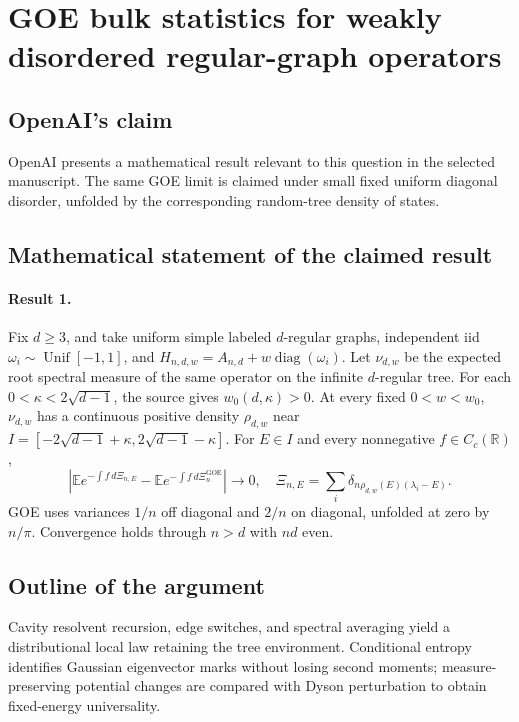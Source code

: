 \documentclass[11pt]{article}
\begin{document}
\section*{GOE bulk statistics for weakly disordered regular-graph operators}

\subsection{OpenAI's claim}
OpenAI presents a mathematical result relevant to this question in the selected manuscript. The same GOE limit is claimed under small fixed uniform diagonal disorder, unfolded by the corresponding random-tree density of states.

\subsection{Mathematical statement of the claimed result}
\paragraph{Result 1.} Fix \(d\ge3\), and take uniform simple labeled \(d\)-regular graphs, independent iid \(\omega_i\sim\operatorname{Unif}[-1,1]\), and \(H_{n,d,w}=A_{n,d}+w\operatorname{diag}(\omega_i)\). Let \(\nu_{d,w}\) be the expected root spectral measure of the same operator on the infinite \(d\)-regular tree. For each \(0<\kappa<2\sqrt{d-1}\), the source gives \(w_0(d,\kappa)>0\). At every fixed \(0<w<w_0\), \(\nu_{d,w}\) has a continuous positive density \(\rho_{d,w}\) near \(I=[-2\sqrt{d-1}+\kappa,2\sqrt{d-1}-\kappa]\). For \(E\in I\) and every nonnegative \(f\in C_c(\mathbb R)\),
\[
 \left|\mathbb E e^{-\int f\,d\Xi_{n,E}}-
 \mathbb E e^{-\int f\,d\Xi_n^{\mathrm{GOE}}}\right|\to0,
 \quad\Xi_{n,E}=\sum_i\delta_{n\rho_{d,w}(E)(\lambda_i-E)}.
\]
GOE uses variances \(1/n\) off diagonal and \(2/n\) on diagonal, unfolded at zero by \(n/\pi\). Convergence holds through \(n>d\) with \(nd\) even.

\subsection{Outline of the argument}
Cavity resolvent recursion, edge switches, and spectral averaging yield a distributional local law retaining the tree environment. Conditional entropy identifies Gaussian eigenvector marks without losing second moments; measure-preserving potential changes are compared with Dyson perturbation to obtain fixed-energy universality.
\end{document}
